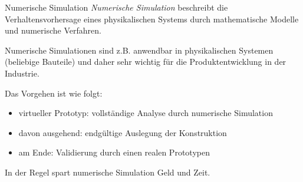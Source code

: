 \begin{defi}{Numerische Simulation}
    \emph{Numerische Simulation} beschreibt die Verhaltensvorhersage eines physikalischen Systems durch mathematische Modelle und numerische Verfahren.

    Numerische Simulationen sind z.B. anwendbar in physikalischen Systemen (beliebige Bauteile) und daher sehr wichtig für die Produktentwicklung in der Industrie.

    Das Vorgehen ist wie folgt:
    \begin{itemize}
        \item virtueller Prototyp: vollständige Analyse durch numerische Simulation
        \item davon ausgehend: endgültige Auslegung der Konstruktion
        \item am Ende: Validierung durch einen realen Prototypen
    \end{itemize}

    In der Regel spart numerische Simulation Geld und Zeit.
\end{defi}